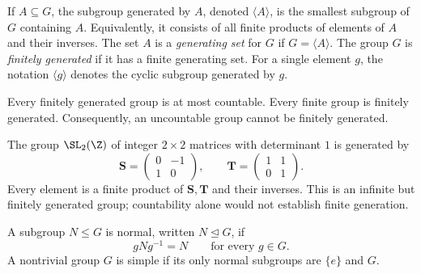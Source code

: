    \begin{definition}\label{pp:generated}
        If $A\subseteq G$, the subgroup generated by $A$, denoted
        $\langle A\rangle$, is the smallest subgroup of $G$ containing $A$.
        Equivalently, it consists of all finite products of elements of $A$ and
        their inverses. The set $A$ is a \emph{generating set} for $G$ if
        $G=\langle A\rangle$. The group $G$ is \emph{finitely generated} if
        it has a finite generating set. For a single element $g$, the notation
        $\langle g\rangle$ denotes the cyclic subgroup generated by $g$.
    \end{definition}

    \begin{proposition}\label{pp:countable}
        Every finitely generated group is at most countable. Every finite group
        is finitely generated. Consequently, an uncountable group cannot be
        finitely generated.
    \end{proposition}

    \begin{fact}\label{r4:sl2-generators}
        The group $\SL_2(\Z)$ of integer $2\times2$ matrices with determinant
        $1$ is generated by
        \[
            \mathbf{S}=\begin{pmatrix}0&-1\\1&0\end{pmatrix},
            \qquad
            \mathbf{T}=\begin{pmatrix}1&1\\0&1\end{pmatrix}.
        \]
        Every element is a finite product of $\mathbf{S},\mathbf{T}$ and
        their inverses. This is an infinite but finitely generated group;
        countability alone would not establish finite generation.
    \end{fact}

    \begin{definition}
        A subgroup $N\leq G$ is normal, written $N\trianglelefteq G$, if
        \[
            gNg^{-1}=N
            \qquad
            \text{for every }g\in G.
        \]
        A nontrivial group $G$ is simple if its only normal subgroups are
        $\{e\}$ and $G$.
    \end{definition}



